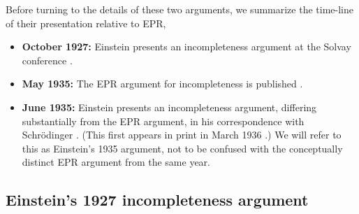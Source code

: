 \documentclass[aps,nofootinbib,12pt]{revtex4-2}
\begin{document}
Before turning to the details of these two arguments, we summarize
the time-line of their presentation relative to EPR,
\begin{itemize}
\item \textbf{October 1927:} Einstein presents an incompleteness argument at
the Solvay conference \cite{bac_valentini}.
\item \textbf{May 1935:} The EPR argument for incompleteness is published \cite{EPR}.
\item \textbf{June 1935:} Einstein presents an incompleteness argument,
differing substantially from the EPR argument, in his correspondence
with Schr\"{o}dinger \cite{EtoS1935}. (This first appears in print
in March 1936 \cite{EPhysik}.) We will refer to this as Einstein's
1935 argument, not to be confused with the conceptually distinct EPR
argument from the same year.
\end{itemize}


\subsection{Einstein's 1927 incompleteness argument\label{SEC:historical_1927}}
\end{document}
